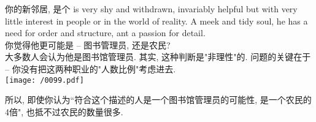 \documentclass[UTF8]{ctexart}
\begin{document}
	

\begin{myEnvSample}
	你的新邻居, 是个 is very shy and withdrawn, invariably helpful but with very little interest in people or in the world of reality. A meek and tidy soul, he has a need for order and structure, ant a passion for detail. \\
	你觉得他更可能是 -- 图书管理员, 还是农民? \\
	大多数人会认为他是图书馆管理员. 其实, 这种判断是"非理性"的. 问题的关键在于 -- 你没有把这两种职业的"人数比例"考虑进去. \\
	
	\texttt{[image: /0099.pdf]}
	
	所以, 即使你认为``符合这个描述的人是一个图书馆管理员的可能性, 是一个农民的4倍", 也抵不过农民的数量很多.
\end{myEnvSample}
\vspace{1em} 
\end{document}
